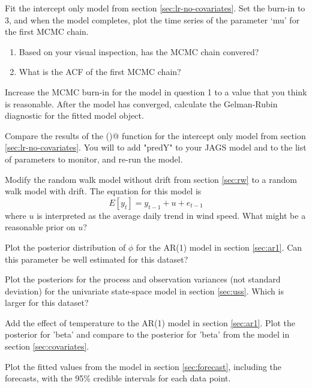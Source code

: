 \begin{hwenumerate}

\item Fit the intercept only model from section \ref{sec:lr-no-covariates}. Set the burn-in to 3, and when the  model completes, plot the time series of the parameter `mu' for the first MCMC chain.
\begin{enumerate}[label=\alph*)]
\item Based on your visual inspection, has the MCMC chain convered?
\item What is the ACF of the first MCMC chain?
\end{enumerate}

\item Increase the MCMC burn-in for the model in question 1 to a value that you think is reasonable. After the model has converged, calculate the Gelman-Rubin diagnostic for the fitted model object.

\item Compare the results of the \verb@plotModelOutput()@ function for the intercept only model from section \ref{sec:lr-no-covariates}. You will to add "predY" to your JAGS model and to the list of parameters to monitor, and re-run the model.

\item Modify the random walk model without drift from section \ref{sec:rw} to a random walk model with drift. The equation for this model is
\begin{equation}
E[{y_t}] = y_{t-1} + u + e_{t-1}
\end{equation}
where $u$ is interpreted as the average daily trend in wind speed. What might be a reasonable prior on $u$? 

\item Plot the posterior distribution of $\phi$ for the AR(1) model in section \ref{sec:ar1}.  Can this parameter be well estimated for this dataset?

\item Plot the posteriors for the process and observation variances (not standard deviation) for the univariate state-space model in section \ref{sec:uss}. Which is larger for this dataset?

\item Add the effect of temperature to the AR(1) model in section \ref{sec:ar1}.  Plot the posterior for 'beta' and compare to the posterior for 'beta' from the model in section \ref{sec:covariates}.

\item Plot the fitted values from the model in section \ref{sec:forecast}, including the forecasts, with the 95\% credible intervals for each data point.


\end{hwenumerate}
